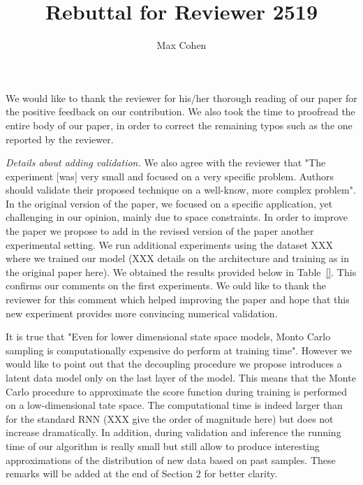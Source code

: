 \documentclass{article}
\title{Rebuttal for Reviewer 2519}
\author{Max Cohen}
\affil{Samovar, T\'el\'ecom SudParis, CITI, TIPIC, Institut Polyechnique de Paris}
\date{}
\begin{document}
\maketitle

We would like to thank the reviewer for his/her thorough reading of our paper for the positive feedback on our contribution. We also took the time to proofread the entire body of our paper, in order to correct the remaining typos such as the one reported by the reviewer.

\textit{Details about adding validation.} We also agree with the reviewer that "The experiment [was] very small and focused
on a very specific problem. Authors should validate their proposed technique on a well-know, more complex problem". In the original version of the paper, we focused on a specific application, yet challenging in our opinion, mainly due to space constraints. In order to improve the paper we propose to add in the revised version of the paper another experimental setting. 
We run additional experiments using the dataset XXX where we trained our model (XXX details on the architecture and training as in the original paper here). We obtained the results provided below in Table~\ref{}. This confirms our comments on the first experiments.
We ould like to thank the reviewer for this comment which helped improving the paper and hope that this new experiment provides more convincing numerical validation.

It is true that  "Even for lower dimensional state space
models, Monto Carlo sampling is computationally expensive do perform at training time". However we would like to point out that the decoupling procedure we propose introduces a latent data model only on the last layer of the model. This means that the Monte Carlo procedure to approximate the score function during training is performed on a low-dimensional tate space. The computational time is indeed larger than for the standard RNN (XXX give the order of magnitude here) but does not increase dramatically.
 In addition, during validation and inference the running time of our algorithm is really small but still allow to produce interesting approximations of the distribution of new data based on past samples. These remarks will be added at the end of Section 2 for better clarity.





\end{document}
